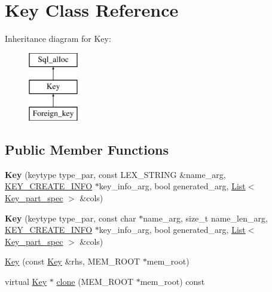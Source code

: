 \hypertarget{classKey}{}\section{Key Class Reference}
\label{classKey}
Inheritance diagram for Key\+:\begin{figure}[H]
\begin{center}
\leavevmode
\includegraphics[height=3.000000cm]{classKey}
\end{center}
\end{figure}
\subsection*{Public Member Functions}
\begin{DoxyCompactItemize}
\item 
\mbox{\label{classKey_a34a24fe38c188feea23f69a78808ca02}} 
{\bfseries Key} (keytype type\+\_\+par, const L\+E\+X\+\_\+\+S\+T\+R\+I\+NG \&name\+\_\+arg, \mbox{\hyperlink{structst__key__create__information}{K\+E\+Y\+\_\+\+C\+R\+E\+A\+T\+E\+\_\+\+I\+N\+FO}} $\ast$key\+\_\+info\+\_\+arg, bool generated\+\_\+arg, \mbox{\hyperlink{classList}{List}}$<$ \mbox{\hyperlink{classKey__part__spec}{Key\+\_\+part\+\_\+spec}} $>$ \&cols)
\item 
\mbox{\label{classKey_a934009c4efa8ef6d2345d9410d24a103}} 
{\bfseries Key} (keytype type\+\_\+par, const char $\ast$name\+\_\+arg, size\+\_\+t name\+\_\+len\+\_\+arg, \mbox{\hyperlink{structst__key__create__information}{K\+E\+Y\+\_\+\+C\+R\+E\+A\+T\+E\+\_\+\+I\+N\+FO}} $\ast$key\+\_\+info\+\_\+arg, bool generated\+\_\+arg, \mbox{\hyperlink{classList}{List}}$<$ \mbox{\hyperlink{classKey__part__spec}{Key\+\_\+part\+\_\+spec}} $>$ \&cols)
\item 
\mbox{\hyperlink{classKey_a10737e8c6b396fdd5b8adce7f7a00eec}{Key}} (const \mbox{\hyperlink{classKey}{Key}} \&rhs, M\+E\+M\+\_\+\+R\+O\+OT $\ast$mem\+\_\+root)
\item 
virtual \mbox{\hyperlink{classKey}{Key}} $\ast$ \mbox{\hyperlink{classKey_ac6f8cb767fc9dcee06fd80ca2350f43f}{clone}} (M\+E\+M\+\_\+\+R\+O\+OT $\ast$mem\+\_\+root) const
\end{DoxyCompactItemize}
